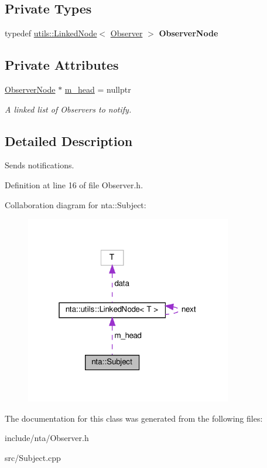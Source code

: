 \subsection*{Private Types}
\begin{DoxyCompactItemize}
\item 
\mbox{\label{classnta_1_1Subject_a7c677f3b882eb4c8204202e9c9ed9e0e}} 
typedef \hyperlink{structnta_1_1utils_1_1LinkedNode}{utils\+::\+Linked\+Node}$<$ \hyperlink{classnta_1_1Observer}{Observer} $>$ {\bfseries Observer\+Node}
\end{DoxyCompactItemize}
\subsection*{Private Attributes}
\begin{DoxyCompactItemize}
\item 
\mbox{\label{classnta_1_1Subject_a7049999f4dcfbaa6ce6af23a98ff2027}} 
\hyperlink{structnta_1_1utils_1_1LinkedNode}{Observer\+Node} $\ast$ \hyperlink{classnta_1_1Subject_a7049999f4dcfbaa6ce6af23a98ff2027}{m\+\_\+head} = nullptr
\begin{DoxyCompactList}\small\item\em A linked list of Observers to notify. \end{DoxyCompactList}\end{DoxyCompactItemize}


\subsection{Detailed Description}
Sends notifications. 

Definition at line 16 of file Observer.\+h.



Collaboration diagram for nta\+:\+:Subject\+:
\nopagebreak
\begin{figure}[H]
\begin{center}
\leavevmode
\includegraphics[width=256pt]{d5/d37/classnta_1_1Subject__coll__graph}
\end{center}
\end{figure}


The documentation for this class was generated from the following files\+:\begin{DoxyCompactItemize}
\item 
include/nta/Observer.\+h\item 
src/Subject.\+cpp\end{DoxyCompactItemize}
